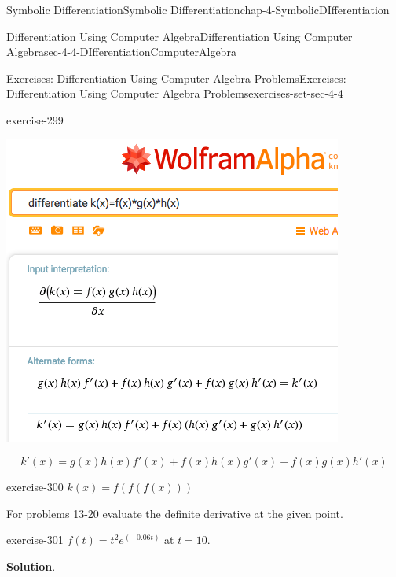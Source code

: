 \documentclass[oneside,10pt,]{book}
\numberwithin{equation}{section}
\begin{document}
\begin{chapterptx}{Symbolic Differentiation}{}{Symbolic Differentiation}{}{}{chap-4-SymbolicDIfferentiation}
\begin{sectionptx}{Differentiation Using Computer Algebra}{}{Differentiation Using Computer Algebra}{}{}{sec-4-4-DIfferentiationComputerAlgebra}
\begin{exercises-subsection-numberless}{Exercises: Differentiation Using Computer Algebra Problems}{}{Exercises: Differentiation Using Computer Algebra Problems}{}{}{exercises-set-sec-4-4}
\begin{divisionexercise}{11}{}{}{exercise-299}
\begin{sidebyside}{1}{0.25}{0.25}{0}
\begin{sbspanel}{0.5}
\includegraphics[width=1\linewidth]{images/sec4-4-sol11a.png}
\end{sbspanel}%
\end{sidebyside}%
%
\begin{equation*}
k'(x)=g(x) h(x) f'(x) + f(x) h(x) g'(x) + f(x) g(x) h'(x) 
\end{equation*}
\end{divisionexercise}%
\begin{divisionexercise}{12}{}{}{exercise-300}%
\hypertarget{p-1760}{}%
\(k(x)=f(f(f(x)))\)%
\end{divisionexercise}%
\hypertarget{p-1761}{}%
For problems 13-20 evaluate the definite derivative at the given point.%
\begin{divisionexercise}{13}{}{}{exercise-301}%
\hypertarget{p-1762}{}%
\(f(t)=t^2 e^{(-0.06t)}\) at \(t=10\).%
\par\smallskip%
\noindent\textbf{Solution}.\hypertarget{solution-150}{}\quad%
\leavevmode%
\begin{sidebyside}{1}{0.3}{0.3}{0}%
\begin{sbspanel}{0.4}%

\end{sbspanel}
\end{sidebyside}
\end{divisionexercise}
\end{exercises-subsection-numberless}
\end{sectionptx}
\end{chapterptx}
\end{document}

